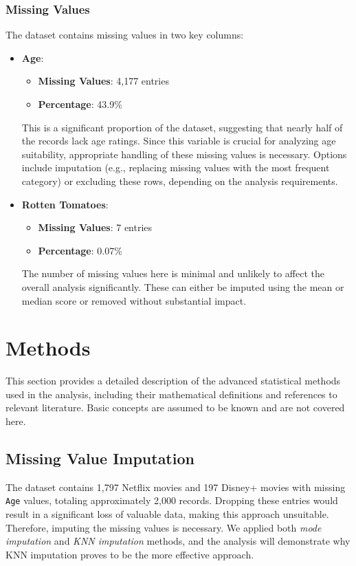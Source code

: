 \documentclass[a4paper, 12pt]{article}
\begin{document}
\subsubsection{Missing Values}

The dataset contains missing values in two key columns:

\begin{itemize}
    \item \textbf{Age}: 
    \begin{itemize}
        \item \textbf{Missing Values}: 4,177 entries
        \item \textbf{Percentage}: 43.9\%
    \end{itemize}
    This is a significant proportion of the dataset, suggesting that nearly half of the records lack age ratings. Since this variable is crucial for analyzing age suitability, appropriate handling of these missing values is necessary. Options include imputation (e.g., replacing missing values with the most frequent category) or excluding these rows, depending on the analysis requirements.

    \item \textbf{Rotten Tomatoes}:
    \begin{itemize}
        \item \textbf{Missing Values}: 7 entries
        \item \textbf{Percentage}: 0.07\%
    \end{itemize}
    The number of missing values here is minimal and unlikely to affect the overall analysis significantly. These can either be imputed using the mean or median score or removed without substantial impact.
\end{itemize}


\section{Methods}
This section provides a detailed description of the advanced statistical methods used in the analysis, including their mathematical definitions and references to relevant literature. Basic concepts are assumed to be known and are not covered here.

\subsection{Missing Value Imputation}

The dataset contains 1,797 Netflix movies and 197 Disney+ movies with missing \texttt{Age} values, totaling approximately 2,000 records. Dropping these entries would result in a significant loss of valuable data, making this approach unsuitable. Therefore, imputing the missing values is necessary.
We applied both \textit{mode imputation} and \textit{KNN imputation} methods, and the analysis will demonstrate why KNN imputation proves to be the more effective approach.
\end{document}
